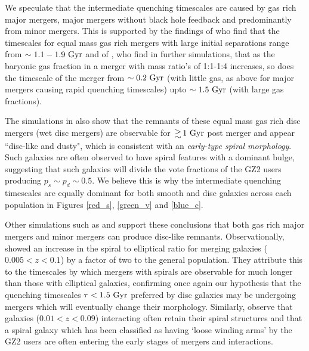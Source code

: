 \documentclass[useAMS,usenatbib]{mn2e}
\def\changed    {\color{titlecol} }
\begin{document}
We speculate that the intermediate quenching timescales are caused by gas rich major mergers, major mergers without black hole feedback and predominantly from minor mergers. This is supported by the findings of \citet{Lotz08}  who find that the timescales for equal mass gas rich mergers with large initial separations range from $\sim 1.1-1.9~\rm{Gyr}$ and of \citet{Lotz11}, who find in further simulations, that as the baryonic gas fraction in a merger with mass ratio's of 1:1-1:4 increases, so does the timescale of the merger from $\sim0.2~\rm{Gyr}$ (with little gas, as above for major mergers causing rapid quenching timescales) upto $\sim1.5~\rm{Gyr}$ (with large gas fractions). 

The simulations in \citet{Lotz08} also show that the remnants of these equal mass gas rich disc mergers (wet disc mergers) are observable for $\ga1~\rm{Gyr}$ post merger and appear ``disc-like and dusty", which is consistent with an \emph{early-type spiral morphology}.  Such galaxies are often observed to have spiral features with a dominant bulge, suggesting that such galaxies will divide the vote fractions of the GZ2 users producing $p_s \sim p_d \sim 0.5$. We believe this is why the intermediate quenching timescales are equally dominant for both smooth and disc galaxies across each population in Figures \ref{red_s}, \ref{green_v} and \ref{blue_c}. 

Other simulations such as \citet{Rob06} and \citet{Barnes02} support these conclusions that both gas rich major mergers and minor mergers can produce disc-like remnants. Observationally, \citet{Darg10a} showed an increase in the spiral to elliptical ratio for merging galaxies ($0.005 < z < 0.1$) by a factor of two to the general population. They attribute this to the timescales by which mergers with spirals are observable for much longer than those with elliptical galaxies, {\changed confirming once again our hypothesis that the quenching timescales $\tau < 1.5 ~\rm{Gyr}$ preferred by disc galaxies may be undergoing mergers which will eventually change their morphology}. Similarly, \citet{Casteels13} observe that galaxies ($0.01 < z < 0.09$) interacting often retain their spiral structures and that a spiral galaxy which has been classified as having `loose winding arms' by the GZ2 users are often entering the early stages of mergers and interactions.
\end{document}
